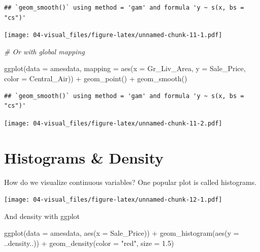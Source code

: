 \documentclass[
]{book}
\newenvironment{Shaded}{\begin{snugshade}}{\end{snugshade}}
\newcommand{\AttributeTok}[1]{\textcolor[rgb]{0.77,0.63,0.00}{#1}}
\newcommand{\CommentTok}[1]{\textcolor[rgb]{0.56,0.35,0.01}{\textit{#1}}}
\newcommand{\FloatTok}[1]{\textcolor[rgb]{0.00,0.00,0.81}{#1}}
\newcommand{\FunctionTok}[1]{\textcolor[rgb]{0.00,0.00,0.00}{#1}}
\newcommand{\NormalTok}[1]{#1}
\newcommand{\SpecialCharTok}[1]{\textcolor[rgb]{0.00,0.00,0.00}{#1}}
\newcommand{\StringTok}[1]{\textcolor[rgb]{0.31,0.60,0.02}{#1}}
\theoremstyle{definition}
\theoremstyle{definition}
\theoremstyle{definition}
\theoremstyle{definition}
\theoremstyle{remark}
\begin{document}
\begin{verbatim}
## `geom_smooth()` using method = 'gam' and formula 'y ~ s(x, bs = "cs")'
\end{verbatim}

\texttt{[image: 04-visual\_files/figure-latex/unnamed-chunk-11-1.pdf]}

\begin{Shaded}
\begin{Highlighting}[]
\CommentTok{\# Or with global mapping}

\FunctionTok{ggplot}\NormalTok{(}\AttributeTok{data =}\NormalTok{ amesdata, }
       \AttributeTok{mapping =} \FunctionTok{aes}\NormalTok{(}\AttributeTok{x =}\NormalTok{ Gr\_Liv\_Area, }
                     \AttributeTok{y =}\NormalTok{ Sale\_Price,}
                     \AttributeTok{color =}\NormalTok{ Central\_Air)) }\SpecialCharTok{+}
  \FunctionTok{geom\_point}\NormalTok{() }\SpecialCharTok{+}
  \FunctionTok{geom\_smooth}\NormalTok{() }
\end{Highlighting}
\end{Shaded}

\begin{verbatim}
## `geom_smooth()` using method = 'gam' and formula 'y ~ s(x, bs = "cs")'
\end{verbatim}

\texttt{[image: 04-visual\_files/figure-latex/unnamed-chunk-11-2.pdf]}

\hypertarget{histograms-density}{%
\section{Histograms \& Density}\label{histograms-density}}

How do we visualize continuous variables? One popular plot is called histograms.

\begin{Shaded}
\end{Shaded}

\texttt{[image: 04-visual\_files/figure-latex/unnamed-chunk-12-1.pdf]}

And density with ggplot

\begin{Shaded}
\begin{Highlighting}[]
\FunctionTok{ggplot}\NormalTok{(}\AttributeTok{data =}\NormalTok{ amesdata, }\FunctionTok{aes}\NormalTok{(}\AttributeTok{x =}\NormalTok{ Sale\_Price)) }\SpecialCharTok{+}
  \FunctionTok{geom\_histogram}\NormalTok{(}\FunctionTok{aes}\NormalTok{(}\AttributeTok{y =}\NormalTok{ ..density..)) }\SpecialCharTok{+}
  \FunctionTok{geom\_density}\NormalTok{(}\AttributeTok{color =} \StringTok{"red"}\NormalTok{,}
               \AttributeTok{size =} \FloatTok{1.5}\NormalTok{)}
\end{Highlighting}
\end{Shaded}
\end{document}

